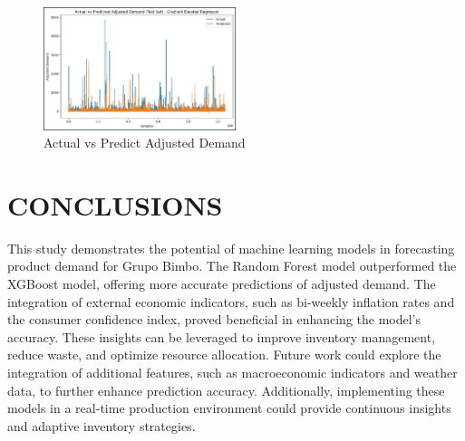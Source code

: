 \documentclass[letterpaper, 10 pt, conference]{ieeeconf}  %
\begin{document}
\begin{figure}[H] 
        \begin{center}
        \centering
        \includegraphics[width=0.5\textwidth]{images/comparisonxg.jpg}
        \caption{Actual vs Predict Adjusted Demand}
        \end{center}
\end{figure} 


\section{CONCLUSIONS}

This study demonstrates the potential of machine learning models in forecasting product demand for Grupo Bimbo. The Random Forest model outperformed the XGBoost model, offering more accurate predictions of adjusted demand. The integration of external economic indicators, such as bi-weekly inflation rates and the consumer confidence index, proved beneficial in enhancing the model's accuracy. These insights can be leveraged to improve inventory management, reduce waste, and optimize resource allocation. Future work could explore the integration of additional features, such as macroeconomic indicators and weather data, to further enhance prediction accuracy. Additionally, implementing these models in a real-time production environment could provide continuous insights and adaptive inventory strategies.

\addtolength{\textheight}{-12cm}   %

\end{document}
